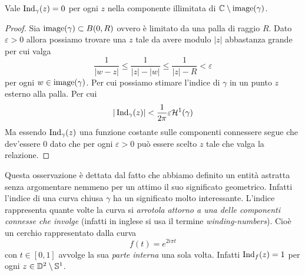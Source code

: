 \begin{corollary}
  Vale $\operatorname{Ind}_\gamma(z) = 0$ per ogni $z$ nella componente
  illimitata di $\mathbb{C} \setminus \operatorname{image}(\gamma)$.  
  \label{cor:index-is-trivial-in-illimited-connex-component}
\end{corollary}
\begin{proof}
  Sia $\operatorname{image}(\gamma) \subset B(0, R)$ ovvero è limitato da una palla di
  raggio $R$. Dato $\varepsilon > 0$ allora possiamo trovare una $z$ tale da
  avere modulo $|z|$ abbastanza grande per cui valga
  \begin{equation*}
    \frac{1}{|w-z|} \le \frac{1}{|z| - |w|} \le \frac{1}{|z| - R}
    < \varepsilon
  \end{equation*}
  per ogni $w \in \operatorname{image}(\gamma)$. Per cui possiamo stimare l'indice di
  $\gamma$ in un punto $z$ esterno alla palla. Per cui
  \begin{equation*}
    |\operatorname{Ind}_\gamma(z)| < \frac{1}{2\pi} \varepsilon
    \mathcal{H}^1(\gamma)
  \end{equation*}
  Ma essendo $\operatorname{Ind}_\gamma(z)$ una funzione costante sulle
  componenti connessere segue che dev'essere $0$ dato che per ogni
  $\varepsilon > 0$ può essere scelto $z$ tale che valga la relazione.
\end{proof}

\begin{remark}
    Questa osservazione è dettata dal fatto che abbiamo definito un entità
    astratta senza argomentare nemmeno per un attimo il suo significato
    geometrico. Infatti l'indice di una curva chiusa $\gamma$ ha un significato
    molto interessante. L'indice rappresenta quante volte la curva si
    \textit{arrotola attorno a una delle componenti connesse che involge} (infatti
    in inglese si usa il termine \textit{winding-numbers}). Cioè un
    cerchio rappresentato dalla curva 
    \begin{equation*}
        f(t) = e^{2i\pi t}
    \end{equation*}
    con $t \in \left[0, 1 \right]$ avvolge la sua \textit{parte interna} una sola
    volta. Infatti $\operatorname{Ind}_f(z) = 1$ per ogni $z \in \mathbb{D}^2 
    \setminus \mathbb{S}^1$.
    \label{rmk:winding-numbers-interpretation}
\end{remark}

